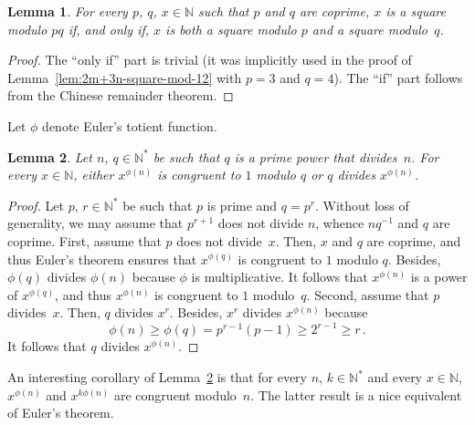 \documentclass[12pt]{article}
\newcommand{\bZ}{\mathbb{Z}}
\newcommand{\bN}{\mathbb{N}} %
\newcommand{\bNast}{\bN^*}
\newtheorem{lemma}{Lemma}
\theoremstyle{definition}
\begin{document}
  \begin{lemma} \label{lem:square-mn-m-n}
   For every $p$, $q$, $x \in \bN$ such that $p$ and $q$ are coprime,
   $x$ is a square modulo $p q$
   if, and only if, $x$ is both a square modulo $p$ and a square modulo~$q$.
 \end{lemma}

 \begin{proof}
   The ``only if'' part is trivial
   (it was implicitly  used in the proof of Lemma~\ref{lem:2m+3n-square-mod-12} with $p = 3$ and $q = 4$).
   The ``if'' part follows from the Chinese remainder theorem.
 \end{proof} 

  Let $\phi$ denote Euler's totient function.

  \begin{lemma} \label{lem:Euler-0-or-1}
    Let $n$, $q \in \bNast$ be such that $q$ is a prime power that divides~$n$.
     For every $x \in \bN$, either $x^{\phi(n)}$ is congruent to $1$ modulo $q$ or $q$ divides $x^{\phi(n)}$.
  \end{lemma}

  \begin{proof}
    Let $p$, $r \in \bNast$ be such that $p$ is prime and $q = p^r$.
    Without loss of generality,
    we may assume that $p^{r + 1}$ does not divide $n$,
    whence $n q^{-1}$ and $q$ are coprime.
    First, assume that $p$ does not divide~$x$.
    Then, $x$ and $q$ are coprime,
    and thus Euler's theorem ensures that $x^{\phi(q)}$ is congruent to $1$ modulo $q$.
    Besides, $\phi(q)$ divides $\phi(n)$ because $\phi$ is multiplicative.
    It follows that $x^{\phi(n)}$ is a power of $x^{\phi(q)}$,
      and thus $x^{\phi(n)}$ is congruent to $1$ modulo~$q$.
    Second, assume that $p$ divides~$x$.
    Then, $q$ divides $x^r$.
    Besides, $x^r$ divides $x^{\phi(n)}$ because
    $$
    \phi(n) \ge \phi(q) = p^{r - 1} (p - 1) \ge 2^{r - 1} \ge r \,.
    $$
    It follows that $q$ divides $x^{\phi(n)}$.
\end{proof} 

An interesting corollary of Lemma~\ref{lem:Euler-0-or-1} is that 
for every $n$, $k \in \bNast$ and every $x \in \bN$,
$x^{\phi(n)}$ and $x^{k \phi(n)}$ are congruent modulo~$n$.
The latter result is a nice equivalent of Euler's theorem.

\end{document}

